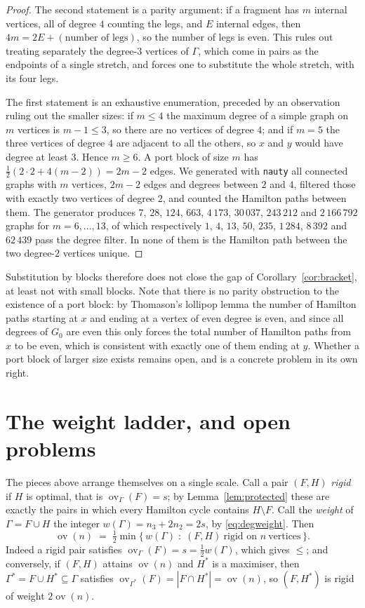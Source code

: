 \documentclass[11pt,a4paper]{article}
\theoremstyle{definition}
\theoremstyle{remark}
\newcommand{\ov}{\operatorname{ov}}
\begin{document}
\begin{proof}
The second statement is a parity argument: if a fragment has $m$ internal vertices, all of degree $4$ counting the legs, and $E$ internal edges, then $4m=2E+(\text{number of legs})$, so the number of legs is even. This rules out treating separately the degree-$3$ vertices of $\Gamma$, which come in pairs as the endpoints of a single stretch, and forces one to substitute the whole stretch, with its four legs.

The first statement is an exhaustive enumeration, preceded by an observation ruling out the smaller sizes: if $m\le4$ the maximum degree of a simple graph on $m$ vertices is $m-1\le3$, so there are no vertices of degree $4$; and if $m=5$ the three vertices of degree $4$ are adjacent to all the others, so $x$ and $y$ would have degree at least $3$. Hence $m\ge6$. A port block of size $m$ has $\tfrac12(2\cdot2+4(m-2))=2m-2$ edges. We generated with \texttt{nauty} all connected graphs with $m$ vertices, $2m-2$ edges and degrees between $2$ and $4$, filtered those with exactly two vertices of degree $2$, and counted the Hamilton paths between them. The generator produces $7$, $28$, $124$, $663$, $4\,173$, $30\,037$, $243\,212$ and $2\,166\,792$ graphs for $m=6,\dots,13$, of which respectively $1$, $4$, $13$, $50$, $235$, $1\,284$, $8\,392$ and $62\,439$ pass the degree filter. In none of them is the Hamilton path between the two degree-$2$ vertices unique.
\end{proof}

Substitution by blocks therefore does not close the gap of Corollary~\ref{cor:bracket}, at least not with small blocks. Note that there is no parity obstruction to the existence of a port block: by Thomason's lollipop lemma \cite{thomason78} the number of Hamilton paths starting at $x$ and ending at a vertex of even degree is even, and since all degrees of $G_0$ are even this only forces the total number of Hamilton paths from $x$ to be even, which is consistent with exactly one of them ending at $y$. Whether a port block of larger size exists remains open, and is a concrete problem in its own right.

\section{The weight ladder, and open problems}\label{sec:open}

The pieces above arrange themselves on a single scale. Call a pair $(F,H)$ \emph{rigid} if $H$ is optimal, that is $\ov_\Gamma(F)=s$; by Lemma~\ref{lem:protected} these are exactly the pairs in which every Hamilton cycle contains $H\setminus F$. Call the \emph{weight} of $\Gamma=F\cup H$ the integer $w(\Gamma)=n_3+2n_2=2s$, by \eqref{eq:degweight}. Then
\[
\ov(n)\;=\;\tfrac12\min\{\,w(\Gamma)\;:\;(F,H)\ \text{rigid on }n\ \text{vertices}\,\}.
\]
Indeed a rigid pair satisfies $\ov_\Gamma(F)=s=\tfrac12w(\Gamma)$, which gives $\le$; and conversely, if $(F,H)$ attains $\ov(n)$ and $H^*$ is a maximiser, then $\Gamma^*=F\cup H^*\subseteq\Gamma$ satisfies $\ov_{\Gamma^*}(F)=|F\cap H^*|=\ov(n)$, so $(F,H^*)$ is rigid of weight $2\ov(n)$.
\end{document}
